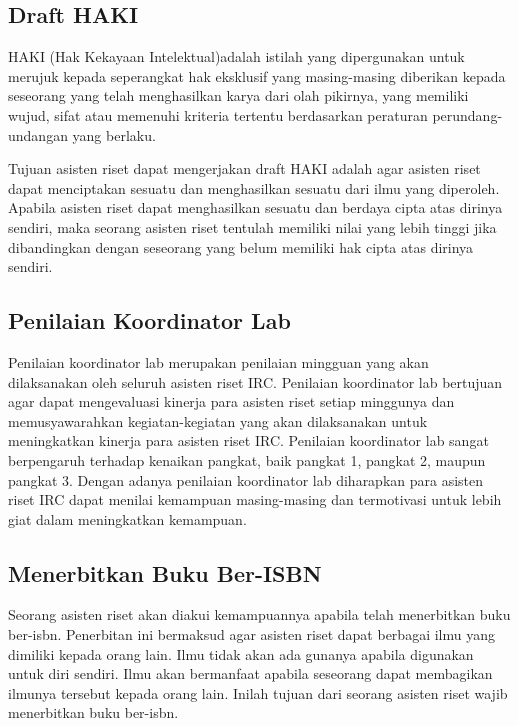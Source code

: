 \subsection{Draft HAKI}
\par
HAKI (Hak Kekayaan Intelektual)adalah istilah yang dipergunakan untuk merujuk kepada seperangkat hak eksklusif yang masing-masing diberikan kepada seseorang yang telah menghasilkan karya dari olah pikirnya, yang memiliki wujud, sifat atau memenuhi kriteria tertentu berdasarkan peraturan perundang-undangan yang berlaku.\\
\par
Tujuan asisten riset dapat mengerjakan draft HAKI adalah agar asisten riset dapat menciptakan sesuatu dan menghasilkan sesuatu dari ilmu yang diperoleh. Apabila asisten riset dapat menghasilkan sesuatu dan berdaya cipta atas dirinya sendiri, maka seorang asisten riset tentulah memiliki nilai yang lebih tinggi jika dibandingkan dengan seseorang yang belum memiliki hak cipta atas dirinya sendiri.

\subsection{Penilaian Koordinator Lab}
\par
Penilaian koordinator lab merupakan penilaian mingguan yang akan dilaksanakan oleh seluruh asisten riset IRC. Penilaian koordinator lab bertujuan agar dapat mengevaluasi kinerja para asisten riset setiap minggunya dan memusyawarahkan kegiatan-kegiatan yang akan dilaksanakan untuk meningkatkan kinerja para asisten riset IRC. Penilaian koordinator lab sangat berpengaruh terhadap kenaikan pangkat, baik pangkat 1, pangkat 2, maupun pangkat 3. Dengan adanya penilaian koordinator lab diharapkan para asisten riset IRC dapat menilai kemampuan masing-masing dan termotivasi untuk lebih giat dalam meningkatkan kemampuan.

\subsection{Menerbitkan Buku Ber-ISBN}
\par
Seorang asisten riset akan diakui kemampuannya apabila telah menerbitkan buku ber-isbn. Penerbitan ini bermaksud agar asisten riset dapat berbagai ilmu yang dimiliki kepada orang lain. Ilmu tidak akan ada gunanya apabila digunakan untuk diri sendiri. Ilmu akan bermanfaat apabila seseorang dapat membagikan ilmunya tersebut kepada orang lain. Inilah tujuan dari seorang asisten riset wajib menerbitkan buku ber-isbn.


